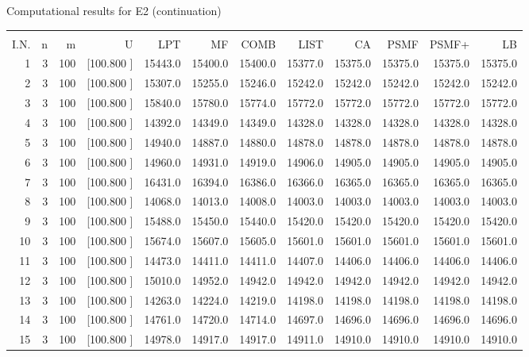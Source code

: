 \documentclass[12pt,a4paper]{article}
\begin{document}
\begin{center}
 Computational results for E2 (continuation) {\tiny
\begin{tabular}{r r r r r r r r r r r r}\hline
    &   &   &          &        &        &        &        &        &        &        &       \\[-0.1in]
  I.N.  &  n  &  m  &  U  &  LPT  &  MF  &  COMB  &  LIST  &  CA  & PSMF &PSMF+ & LB \\[0.03in]
\hline
   1&  3&100&[100.800   ]& 15443.0& 15400.0& 15400.0& 15377.0& 15375.0& 15375.0& 15375.0& 15375.0\\[-0.02in]
   2&  3&100&[100.800   ]& 15307.0& 15255.0& 15246.0& 15242.0& 15242.0& 15242.0& 15242.0& 15242.0\\[-0.02in]
   3&  3&100&[100.800   ]& 15840.0& 15780.0& 15774.0& 15772.0& 15772.0& 15772.0& 15772.0& 15772.0\\[-0.02in]
   4&  3&100&[100.800   ]& 14392.0& 14349.0& 14349.0& 14328.0& 14328.0& 14328.0& 14328.0& 14328.0\\[-0.02in]
   5&  3&100&[100.800   ]& 14940.0& 14887.0& 14880.0& 14878.0& 14878.0& 14878.0& 14878.0& 14878.0\\[-0.02in]
   6&  3&100&[100.800   ]& 14960.0& 14931.0& 14919.0& 14906.0& 14905.0& 14905.0& 14905.0& 14905.0\\[-0.02in]
   7&  3&100&[100.800   ]& 16431.0& 16394.0& 16386.0& 16366.0& 16365.0& 16365.0& 16365.0& 16365.0\\[-0.02in]
   8&  3&100&[100.800   ]& 14068.0& 14013.0& 14008.0& 14003.0& 14003.0& 14003.0& 14003.0& 14003.0\\[-0.02in]
   9&  3&100&[100.800   ]& 15488.0& 15450.0& 15440.0& 15420.0& 15420.0& 15420.0& 15420.0& 15420.0\\[-0.02in]
  10&  3&100&[100.800   ]& 15674.0& 15607.0& 15605.0& 15601.0& 15601.0& 15601.0& 15601.0& 15601.0\\[-0.02in]
  11&  3&100&[100.800   ]& 14473.0& 14411.0& 14411.0& 14407.0& 14406.0& 14406.0& 14406.0& 14406.0\\[-0.02in]
  12&  3&100&[100.800   ]& 15010.0& 14952.0& 14942.0& 14942.0& 14942.0& 14942.0& 14942.0& 14942.0\\[-0.02in]
  13&  3&100&[100.800   ]& 14263.0& 14224.0& 14219.0& 14198.0& 14198.0& 14198.0& 14198.0& 14198.0\\[-0.02in]
  14&  3&100&[100.800   ]& 14761.0& 14720.0& 14714.0& 14697.0& 14696.0& 14696.0& 14696.0& 14696.0\\[-0.02in]
  15&  3&100&[100.800   ]& 14978.0& 14917.0& 14917.0& 14911.0& 14910.0& 14910.0& 14910.0& 14910.0\\[-0.02in]

\end{tabular}}
\end{center}
\end{document}
